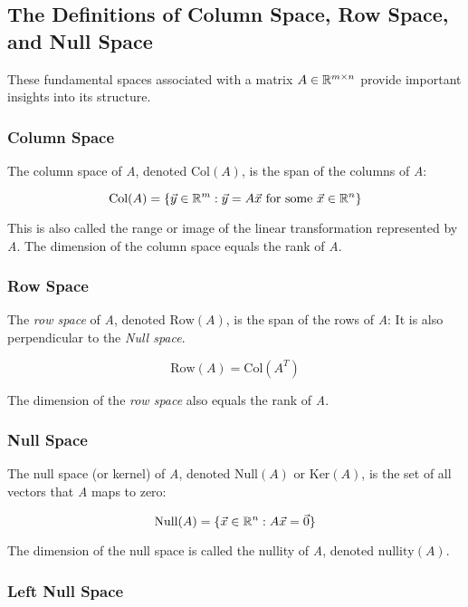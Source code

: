 \subsection{The Definitions of Column Space, Row Space, and Null Space}

These fundamental spaces associated with a matrix \(A \in \mathbb{R}^{m \times n}\) provide important insights into its structure.

\subsubsection{Column Space}

The column space of \emph{A}, denoted \(\text{Col}(A)\), is the span of the columns of \emph{A}:

\[
    \text{Col}(A) = \{\vec{y} \in \mathbb{R}^m : \vec{y} = A\vec{x} \text{ for some } \vec{x} \in \mathbb{R}^n\}
\]

This is also called the range or image of the linear transformation represented by \emph{A}. The dimension of the column space equals the rank of \emph{A}.

\subsubsection{Row Space}

The \emph{row space} of \emph{A}, denoted \(\text{Row}(A)\), is the span of the rows of \emph{A}:
 It is also perpendicular to the \emph{Null space}.

\[
    \text{Row}(A) = \text{Col}(A^T)
\]

The dimension of the \emph{row space} also equals the rank of \emph{A}.

\subsubsection{Null Space}

The null space (or kernel) of \emph{A}, denoted \(\text{Null}(A)\) or \(\text{Ker}(A)\), 
is the set of all vectors that \emph{A} maps to zero:

\[
    \text{Null}(A) = \{\vec{x} \in \mathbb{R}^n : A\vec{x} = \vec{0}\}
\]

The dimension of the null space is called the nullity of \emph{A}, denoted \(\text{nullity}(A)\).

\subsubsection{Left Null Space}

